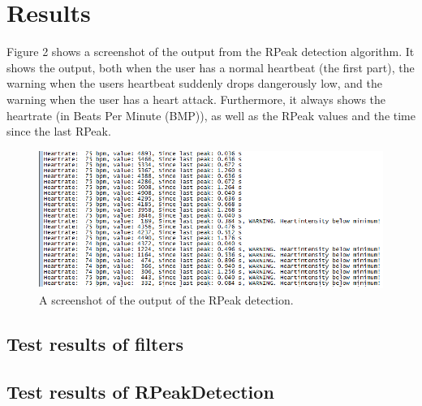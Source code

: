\documentclass[12pt,a4paper]{article}
\begin{document}
\section{Results}
	Figure 2 shows a screenshot of the output from the RPeak detection algorithm. It shows the output, both when the user has a normal heartbeat (the first part), the warning when the users heartbeat suddenly drops dangerously low, and the warning when the user has a heart attack. Furthermore, it always shows the heartrate (in Beats Per Minute (BMP)), as well as the RPeak values and the time since the last RPeak.
	
	
	\begin{figure}[h!]
		\centering
			\includegraphics[width=1\textwidth]{Screenshots/RPeakDetection_result.png}
		\caption{A screenshot of the output of the RPeak detection.}
		\label{RPeakDetection_result}
	\end{figure}
\subsection{Test results of filters}

\begin{figure}[h!]
\end{figure}
\subsection{Test results of RPeakDetection}
\end{document}
